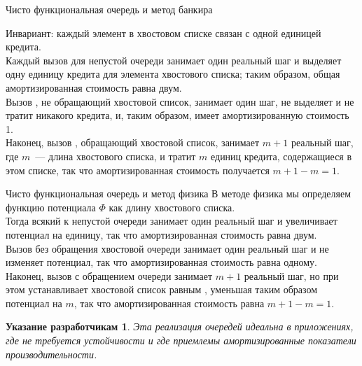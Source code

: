 \documentclass[aspectratio=169
  , xcolor={svgnames}
  , hyperref={ colorlinks,citecolor=DeepPink4
             , linkcolor=DarkRed,urlcolor=DarkBlue}
  , russian
  ]{beamer}
\newtheorem{hint}{\textbf{Указание разработчикам}}[section]
\theoremstyle{exerciseStyle1}
\begin{document}
\begin{frame}[fragile]{Чисто функциональная очередь и метод банкира}

Инвариант: каждый элемент в
хвостовом списке связан с одной единицей кредита. \\

Каждый вызов
 для непустой очереди занимает один реальный шаг и
выделяет одну единицу кредита для элемента хвостового списка; таким
образом, общая амортизированная стоимость равна двум. \\

Вызов
, не обращающий хвостовой список, занимает один шаг,
не выделяет и не тратит никакого кредита, и, таким образом, имеет
амортизированную стоимость 1. \\

Наконец, вызов ,
обращающий хвостовой список, занимает $m+1$ реальный шаг, где $m$~---
длина хвостового списка, и тратит $m$ единиц кредита, содержащиеся в
этом списке, так что амортизированная стоимость получается $m + 1 - m
= 1$.

\end{frame}


\begin{frame}[fragile]{Чисто функциональная очередь и метод физика}
В методе физика мы определяем функцию потенциала $\Phi$ как длину
хвостового списка. \\

Тогда всякий  к непустой очереди
занимает один реальный шаг и увеличивает потенциал на единицу, так что
амортизированная стоимость равна двум. \\

Вызов  без
обращения хвостовой очереди занимает один реальный шаг и не изменяет
потенциал, так что амортизированная стоимость равна одному.\\

 Наконец,
вызов  с обращением очереди занимает $m+1$ реальный
шаг, но при этом устанавливает хвостовой список равным \hsinline{[]},
уменьшая таким образом потенциал на $m$, так что амортизированная
стоимость равна $m + 1 - m = 1$.

\end{frame}


\begin{frame}[fragile]{}
\begin{hint}
  Эта реализация очередей идеальна в приложениях, где не требуется
  устойчивости и где приемлемы амортизированные показатели
  производительности.
\end{hint}

\end{frame}
\end{document}
